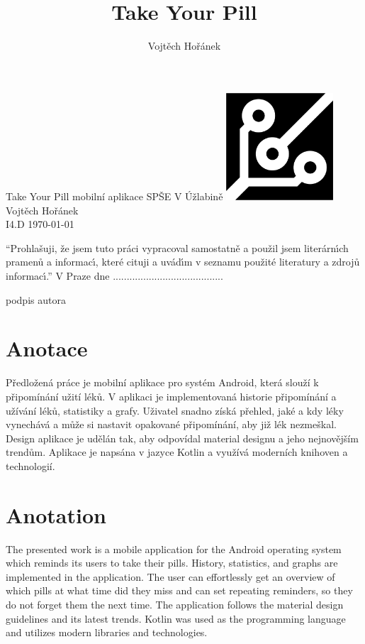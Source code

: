 \documentclass[a4paper,12pt]{report}
\title{Take Your Pill}
\author{Vojtěch Hořánek}
\begin{document}
\begin{titlepage}
    \large
    \centering
    \vspace*{\fill}
    {\LARGE Take Your Pill}
    \vskip 1mm
    {\Large mobilní aplikace}
    \vskip1cm
    {\large SPŠE V Úžlabině}
    \vskip 20pt
    \includegraphics[width=4cm]{uzlabina.png}
    \vskip 40pt
    Vojtěch Hořánek \\
    I4.D
    \vskip 15pt
    \today
    \vfill
\end{titlepage}


\vspace*{\fill}
\enquote{Prohlašuji, že jsem tuto práci vypracoval samostatně a použil jsem literárnı́ch pramenů a informacı́, které cituji a uvádı́m v seznamu použité literatury a zdrojů informacı́.}\hfill \break
V Praze dne
{
  ....................\hfill....................
}
\begin{flushright}
    podpis autora
\end{flushright} 


\newpage
\section*{Anotace}
Předložená práce je mobilní aplikace pro systém Android, která slouží k připomínání užití léků. V aplikaci je implementovaná historie připomínání a užívání léků, statistiky a grafy. Uživatel snadno získá přehled, jaké a kdy léky vynechává a může si nastavit opakované připomínání, aby již lék nezmeškal. Design aplikace je udělán tak, aby odpovídal material designu a jeho nejnovějším trendům. Aplikace je napsána v jazyce Kotlin a využívá moderních knihoven a technologií.
\vspace*{\fill}
\section*{Anotation}
The presented work is a mobile application for the Android operating system which reminds its users to take their pills. History, statistics, and graphs are implemented in the application. The user can effortlessly get an overview of which pills at what time did they miss and can set repeating reminders, so they do not forget them the next time. The application follows the material design guidelines and its latest trends. Kotlin was used as the programming language and utilizes modern libraries and technologies.
\end{document}
